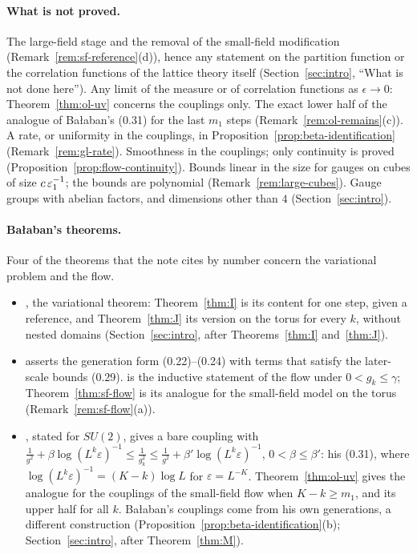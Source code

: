 \paragraph{What is not proved.} The large-field stage and the removal of the small-field modification (Remark~\ref{rem:sf-reference}(d)), hence any statement on the partition function or the correlation functions of the lattice theory itself (Section~\ref{sec:intro}, ``What is not done here''). Any limit of the measure or of correlation functions as $\epsilon\to0$: Theorem~\ref{thm:ol-uv} concerns the couplings only. The exact lower half of the analogue of Ba\l aban's (0.31) for the last $m_1$ steps (Remark~\ref{rem:ol-remains}(c)). A rate, or uniformity in the couplings, in Proposition~\ref{prop:beta-identification} (Remark~\ref{rem:gl-rate}). Smoothness in the couplings; only continuity is proved (Proposition~\ref{prop:flow-continuity}). Bounds linear in the size for gauges on cubes of size $c\,\varepsilon_1^{-1}$; the bounds are polynomial (Remark~\ref{rem:large-cubes}). Gauge groups with abelian factors, and dimensions other than $4$ (Section~\ref{sec:intro}).

\paragraph{Ba\l aban's theorems.} Four of the theorems that the note cites by number concern the variational problem and the flow.
\begin{itemize}
\item \cite[Theorem~1]{BalVar}, the variational theorem: Theorem~\ref{thm:I} is its content for one step, given a reference, and Theorem~\ref{thm:J} its version on the torus for every $k$, without nested domains (Section~\ref{sec:intro}, after Theorems~\ref{thm:I} and~\ref{thm:J}).
\item \cite[Theorem~1]{BalYM4I} asserts the generation form (0.22)--(0.24) with terms that satisfy the later-scale bounds (0.29). \cite[Theorem~3]{BalYM4I} is the inductive statement of the flow under $0<g_k\le\gamma$; Theorem~\ref{thm:sf-flow} is its analogue for the small-field model on the torus (Remark~\ref{rem:sf-flow}(a)).
\item \cite[Theorem~2]{BalYM4I}, stated for $SU(2)$, gives a bare coupling with $\frac1{g^2}+\beta\log(L^k\varepsilon)^{-1}\le\frac1{g_k^2}\le\frac1{g^2}+\beta'\log(L^k\varepsilon)^{-1}$, $0<\beta\le\beta'$: his (0.31), where $\log(L^k\varepsilon)^{-1}=(K-k)\log L$ for $\varepsilon=L^{-K}$. Theorem~\ref{thm:ol-uv} gives the analogue for the couplings of the small-field flow when $K-k\ge m_1$, and its upper half for all $k$. Ba\l aban's couplings come from his own generations, a different construction (Proposition~\ref{prop:beta-identification}(b); Section~\ref{sec:intro}, after Theorem~\ref{thm:M}).
\end{itemize}


